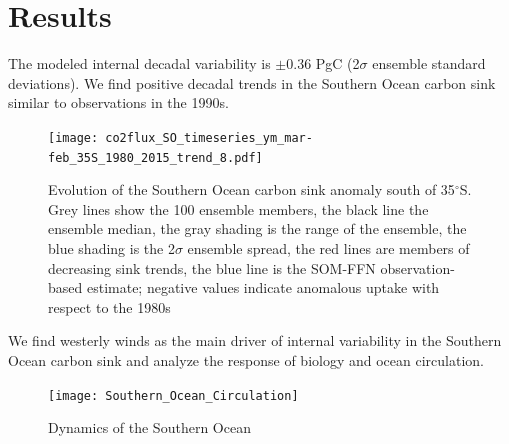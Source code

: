 \documentclass[aspectratio=169]{beamer}
\begin{document}
\section{Results}
\begin{frame}{The modeled internal decadal variability is $\pm$0.36 PgC (2$\sigma$ ensemble standard deviations). We find positive decadal trends in the Southern Ocean carbon sink similar to observations in the 1990s. } 
	\vspace{-.2cm}
	\begin{figure}
		\centering
		\texttt{[image: co2flux\_SO\_timeseries\_ym\_mar-feb\_35S\_1980\_2015\_trend\_8.pdf]}
\vspace{-.2cm}		
		\caption{Evolution of the Southern Ocean carbon sink anomaly south of 35$^\circ$S. Grey lines show the 100 ensemble members, the black line the ensemble median, the gray shading is the range of the ensemble, the blue shading is the 2$\sigma$ ensemble spread, the red lines are members of decreasing sink trends, the blue line is the SOM-FFN observation-based estimate; negative values indicate anomalous uptake with respect to the 1980s}
	\end{figure}
\end{frame}	

\begin{frame}{We find westerly winds as the main driver of internal variability in the Southern Ocean carbon sink and analyze the response of biology and ocean circulation.}
	\begin{figure}
	\texttt{[image: Southern\_Ocean\_Circulation]}
\vspace{-2mm}
	\caption{Dynamics of the Southern Ocean \citep{Morrison2015}}
	\end{figure}
\end{frame}
	
	
	
\end{document}
